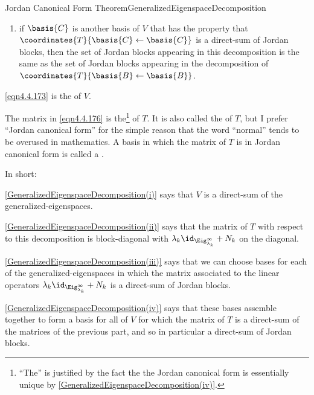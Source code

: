 \begin{thm}{Jordan Canonical Form Theorem}{GeneralizedEigenspaceDecomposition}
\begin{enumerate}
		\begin{equation}\label{eqn4.4.176}
			\coordinates{T}{\basis{B}\leftarrow \basis{B}}
		\end{equation}
		is the direct-sum of the matrices in \eqref{eqn4.4.175}; and
		\item \label{GeneralizedEigenspaceDecomposition(v)}if $\basis{C}$ is another basis of $V$ that has the property that $\coordinates{T}{\basis{C}\leftarrow \basis{C}}$ is a direct-sum of Jordan blocks, then the set of Jordan blocks appearing in this decomposition is the same as the set of Jordan blocks appearing in the decomposition of $\coordinates{T}{\basis{B}\leftarrow \basis{B}}$.
	\end{enumerate}
	\begin{rmk}
		\eqref{eqn4.4.173} is the  of $V$.
	\end{rmk}
	\begin{rmk}
		The matrix in \eqref{eqn4.4.176} is the\footnote{``The'' is justified by the fact the the Jordan canonical form is essentially unique by \cref{GeneralizedEigenspaceDecomposition(iv)}.}  of $T$.  It is also called the  of $T$, but I prefer ``Jordan canonical form'' for the simple reason that the word ``normal'' tends to be overused in mathematics.  A basis in which the matrix of $T$ is in Jordan canonical form is called a \index{Jordan basis}.
	\end{rmk}
	\begin{rmk}
		In short:
		
		\cref{GeneralizedEigenspaceDecomposition(i)} says that $V$ is a direct-sum of the generalized-eigenspaces.
		
		\cref{GeneralizedEigenspaceDecomposition(ii)} says that the matrix of $T$ with respect to this decomposition is block-diagonal with $\lambda _k\id _{\Eig _{\lambda _k}^{\infty}}+N_k$ on the diagonal.
		 
		\cref{GeneralizedEigenspaceDecomposition(iii)} says that we can choose bases for each of the generalized-eigenspaces in which the matrix associated to the linear operators $\lambda _k\id _{\Eig _{\lambda _k}^{\infty}}+N_k$ is a direct-sum of Jordan blocks.
		 
		\cref{GeneralizedEigenspaceDecomposition(iv)} says that these bases assemble together to form a basis for all of $V$ for which the matrix of $T$ is a direct-sum of the matrices of the previous part, and so in particular a direct-sum of Jordan blocks.
		

\end{rmk}
\end{thm}
